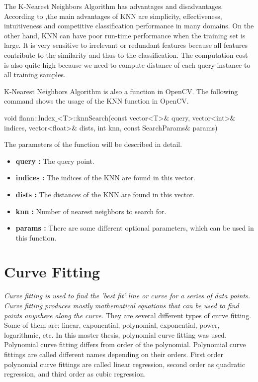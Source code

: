 The K-Nearest Neighbors Algorithm has advantages and disadvantages. According to \cite{k_nearest_neighbors_adv_disadv},the main advantages of KNN are simplicity, effectiveness, intuitiveness and competitive classification performance in many domains. On the other hand, KNN can have poor run-time performance when the training set is large. It is very sensitive to irrelevant or redundant features because all features contribute to the similarity and thus to the classification. The computation cost is also quite high because we need to compute distance of each query instance to all training samples. 

K-Nearest Neighbors Algorithm is also a function in OpenCV. The following command shows the usage of the KNN function in OpenCV.

\begin{center}

void flann::Index$\_$<T>::knnSearch(const vector<T>$\&$ query, vector<int>$\&$ indices, vector<float>$\&$ dists, int knn, const SearchParams$\&$ params)

\end{center}

The parameters of the function will be described in detail.\cite{k_nearest_neighbors_OpenCV}

\begin{itemize}

\item \textbf{query : }The query point.

\item \textbf{indices : }The indices of the KNN are found in this vector.

\item \textbf{dists : }The distances of the KNN are found in this vector.

\item \textbf{knn : }Number of nearest neighbors to search for.

\item \textbf{params : }There are some different optional parameters, which can be used in this function.

\end{itemize}


%
\section{Curve Fitting}\label{sec:Curve Fitting}

\emph{\color{red}Curve fitting is used to find the 'best fit' line or curve for a series of data points. Curve fitting produces mostly mathematical equations that can be used to find points anywhere along
the curve.\cite{Curve_Fitting}} They are several different types of curve fitting. Some of them are: linear, exponential, polynomial, exponential, power, logarithmic, etc. In this master thesis, polynomial curve fitting was used. Polynomial curve fitting differs from order of the polynomial. Polynomial curve fittings are called different names depending on their orders. First order polynomial curve fittings are called linear regression, second order as quadratic regression, and third order as cubic regression.


